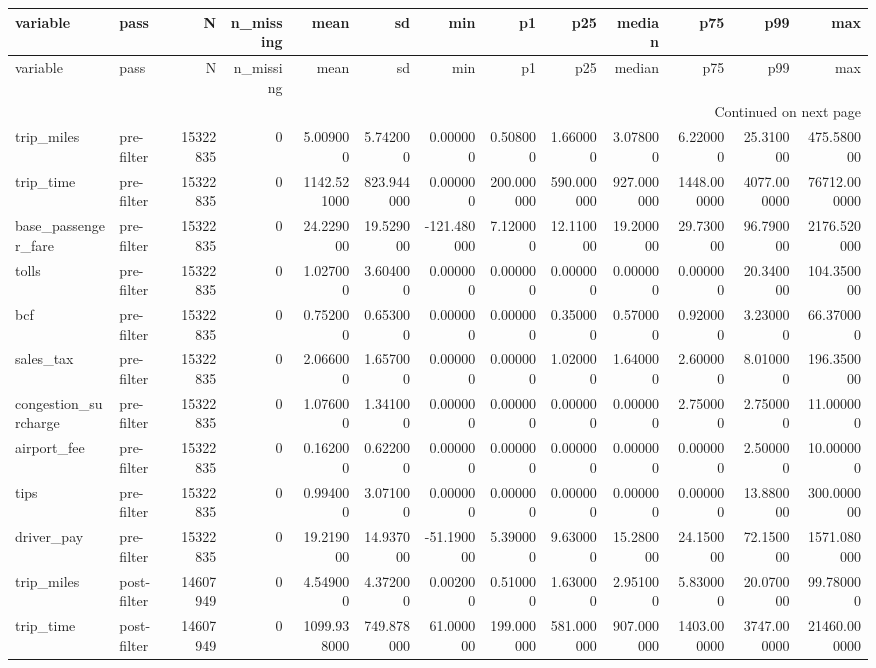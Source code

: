 \begin{longtable}{llrrrrrrrrrrr}
\toprule
variable & pass & N & n_missing & mean & sd & min & p1 & p25 & median & p75 & p99 & max \\
\midrule
\endfirsthead
\toprule
variable & pass & N & n_missing & mean & sd & min & p1 & p25 & median & p75 & p99 & max \\
\midrule
\endhead
\midrule
\multicolumn{13}{r}{Continued on next page} \\
\midrule
\endfoot
\bottomrule
\endlastfoot
trip_miles & pre-filter & 15322835 & 0 & 5.009000 & 5.742000 & 0.000000 & 0.508000 & 1.660000 & 3.078000 & 6.220000 & 25.310000 & 475.580000 \\
trip_time & pre-filter & 15322835 & 0 & 1142.521000 & 823.944000 & 0.000000 & 200.000000 & 590.000000 & 927.000000 & 1448.000000 & 4077.000000 & 76712.000000 \\
base_passenger_fare & pre-filter & 15322835 & 0 & 24.229000 & 19.529000 & -121.480000 & 7.120000 & 12.110000 & 19.200000 & 29.730000 & 96.790000 & 2176.520000 \\
tolls & pre-filter & 15322835 & 0 & 1.027000 & 3.604000 & 0.000000 & 0.000000 & 0.000000 & 0.000000 & 0.000000 & 20.340000 & 104.350000 \\
bcf & pre-filter & 15322835 & 0 & 0.752000 & 0.653000 & 0.000000 & 0.000000 & 0.350000 & 0.570000 & 0.920000 & 3.230000 & 66.370000 \\
sales_tax & pre-filter & 15322835 & 0 & 2.066000 & 1.657000 & 0.000000 & 0.000000 & 1.020000 & 1.640000 & 2.600000 & 8.010000 & 196.350000 \\
congestion_surcharge & pre-filter & 15322835 & 0 & 1.076000 & 1.341000 & 0.000000 & 0.000000 & 0.000000 & 0.000000 & 2.750000 & 2.750000 & 11.000000 \\
airport_fee & pre-filter & 15322835 & 0 & 0.162000 & 0.622000 & 0.000000 & 0.000000 & 0.000000 & 0.000000 & 0.000000 & 2.500000 & 10.000000 \\
tips & pre-filter & 15322835 & 0 & 0.994000 & 3.071000 & 0.000000 & 0.000000 & 0.000000 & 0.000000 & 0.000000 & 13.880000 & 300.000000 \\
driver_pay & pre-filter & 15322835 & 0 & 19.219000 & 14.937000 & -51.190000 & 5.390000 & 9.630000 & 15.280000 & 24.150000 & 72.150000 & 1571.080000 \\
trip_miles & post-filter & 14607949 & 0 & 4.549000 & 4.372000 & 0.002000 & 0.510000 & 1.630000 & 2.951000 & 5.830000 & 20.070000 & 99.780000 \\
trip_time & post-filter & 14607949 & 0 & 1099.938000 & 749.878000 & 61.000000 & 199.000000 & 581.000000 & 907.000000 & 1403.000000 & 3747.000000 & 21460.000000 \\

\end{longtable}
